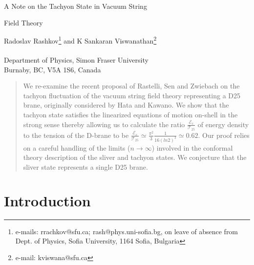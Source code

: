 \documentclass[a4paper,12pt]{article}
\begin{document}
\vspace*{1cm}

\begin{center}
{\bf{\Large A Note on the Tachyon State in Vacuum String \\
\vspace*{.35cm}

Field Theory }}

\vspace*{1cm}

Radoslav Rashkov\footnote{e-mails: rrachkov@sfu.ca; rash@phys.uni-sofia.bg,
on leave of absence from Dept. of Physics, Sofia University, 1164 Sofia,
Bulgaria}
and K Sankaran Viswanathan\footnote{e-mail: kviswana@sfu.ca}\\

\ \\
Department of Physics, Simon Fraser University \\
Burnaby, BC, V5A 1S6, Canada
\end{center}


\vspace*{.8cm}

\begin{abstract}
We re-examine the recent proposal of Rastelli, Sen and Zwiebach on the tachyon
fluctuation of the vacuum string field theory representing a D25 brane,
originally considered by Hata and Kawano. We show that the tachyon state
satisfies the linearized equations of motion on-shell in the strong sense
thereby allowing us to calculate the ratio
$
\frac{
{\mathcal E}_c}
{{\mathcal T}_{25}}
$
of energy density to the tension of the D-brane to be
$
\frac{
{\mathcal E}_c}
{
{\mathcal T}_{25}}\simeq\frac{\pi^2}{3}\frac{1}{16(ln2)^3}
\simeq 0.62.
$
Our proof relies on a careful handling of the limits ($n\to\infty$) involved in
the conformal theory description of the sliver and tachyon states.
We conjecture that the sliver state represents a single D25 brane.
\end{abstract}

\vspace*{.8cm}

\section{Introduction}
\end{document}
